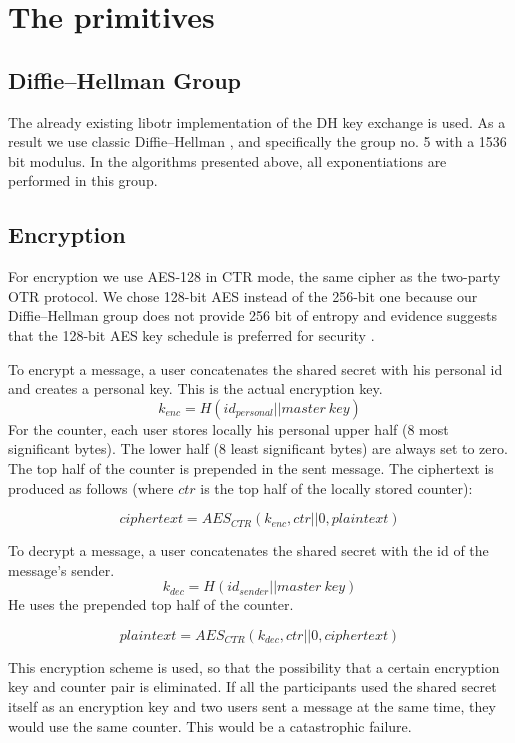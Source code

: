 \documentclass[]{article}
\begin{document}
\section{The primitives}

\subsection{Diffie--Hellman Group}
The already existing libotr implementation of the DH key exchange is used.
As a result we use classic Diffie--Hellman , and specifically the group no. 5 \cite{website:dh-rfc} with a 1536 bit modulus.
In the algorithms presented above, all exponentiations are performed in this group.

\subsection{Encryption}
For encryption we use AES-128 in CTR mode, the same cipher as the two-party OTR protocol.
We chose 128-bit AES instead of the 256-bit one because our Diffie--Hellman group does not provide 256 bit of entropy and evidence suggests that the 128-bit AES key schedule is preferred for security \cite{aes-key-recov} \cite{rijndael-improved-analysis}.

To encrypt a message, a user concatenates the shared secret with his personal id and creates a personal key.
This is the actual encryption key.
\[
k_{enc} = H(id_{personal} || master\ key)
\]
For the counter, each user stores locally his personal upper half (8 most significant bytes).
The lower half (8 least significant bytes) are always set to zero.
The top half of the counter is prepended in the sent message.
The ciphertext is produced as follows (where $ctr$ is the top half of the locally stored counter):

\[
ciphertext = AES_{CTR}(k_{enc}, ctr||0, plaintext)
\]

To decrypt a message, a user concatenates the shared secret with the id of the message's sender.
\[
k_{dec} = H(id_{sender} || master\ key)
\]
He uses the prepended top half of the counter.

\[
plaintext = AES_{CTR}(k_{dec}, ctr||0, ciphertext)
\]

This encryption scheme is used, so that the possibility that a certain encryption key and counter pair is eliminated.
If all the participants used the shared secret itself as an encryption key and two users sent a message at the same time, they would use the same counter.
This would be a catastrophic failure.
\end{document}
